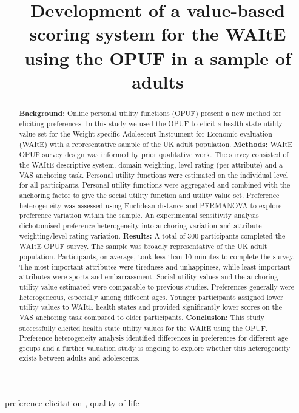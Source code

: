 \documentclass[
  number,
  preprint]{elsarticle}
\begin{document}
\begin{frontmatter}
\title{Development of a value-based scoring system for the WAItE using
the OPUF in a sample of adults}


        
\begin{abstract}
\textbf{Background:} Online personal utility functions (OPUF) present a
new method for eliciting preferences. In this study we used the OPUF to
elicit a health state utility value set for the Weight-specific
Adolescent Instrument for Economic-evaluation (WAItE) with a
representative sample of the UK adult population. \textbf{Methods:}
WAItE OPUF survey design was informed by prior qualitative work. The
survey consisted of the WAItE descriptive system, domain weighting,
level rating (per attribute) and a VAS anchoring task. Personal utility
functions were estimated on the individual level for all participants.
Personal utility functions were aggregated and combined with the
anchoring factor to give the social utility function and utility value
set. Preference heterogeneity was assessed using Euclidean distance and
PERMANOVA to explore preference variation within the sample. An
experimental sensitivity analysis dichotomised preference heterogeneity
into anchoring variation and attribute weighting/level rating variation.
\textbf{Results:} A total of 300 participants completed the WAItE OPUF
survey. The sample was broadly representative of the UK adult
population. Participants, on average, took less than 10 minutes to
complete the survey. The most important attributes were tiredness and
unhappiness, while least important attributes were sports and
embarrassment. Social utility values and the anchoring utility value
estimated were comparable to previous studies. Preferences generally
were heterogeneous, especially among different ages. Younger
participants assigned lower utility values to WAItE health states and
provided significantly lower scores on the VAS anchoring task compared
to older participants. \textbf{Conclusion:} This study successfully
elicited health state utility values for the WAItE using the OPUF.
Preference heterogeneity analysis identified differences in preferences
for different age groups and a further valuation study is ongoing to
explore whether this heterogeneity exists between adults and
adolescents.
\end{abstract}





\begin{keyword}
    preference elicitation \sep 
    quality of life
\end{keyword}
\end{frontmatter}
    
\end{document}
